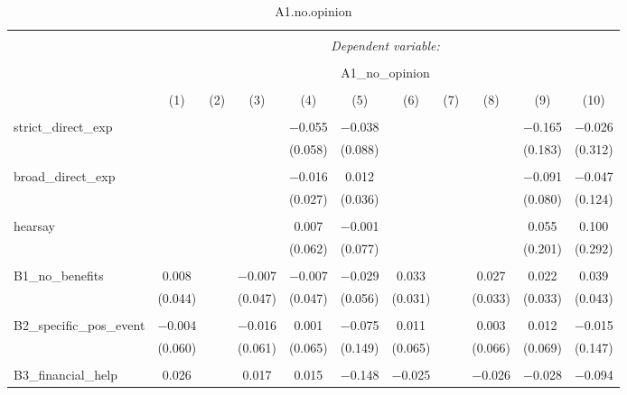
\begin{table}[H] \centering 
  \caption{A1.no.opinion} 
  \label{} 
\tiny 
\begin{tabular}{@{\extracolsep{4pt}}lcccccccccc} 
\\[-1.8ex]\hline 
\hline \\[-1.8ex] 
 & \multicolumn{10}{c}{\textit{Dependent variable:}} \\ 
\cline{2-11} 
\\[-1.8ex] & \multicolumn{10}{c}{A1\_no\_opinion} \\ 
\\[-1.8ex] & (1) & (2) & (3) & (4) & (5) & (6) & (7) & (8) & (9) & (10)\\ 
\hline \\[-1.8ex] 
 strict\_direct\_exp &  &  &  & $-$0.055 & $-$0.038 &  &  &  & $-$0.165 & $-$0.026 \\ 
  &  &  &  & (0.058) & (0.088) &  &  &  & (0.183) & (0.312) \\ 
  & & & & & & & & & & \\ 
 broad\_direct\_exp &  &  &  & $-$0.016 & 0.012 &  &  &  & $-$0.091 & $-$0.047 \\ 
  &  &  &  & (0.027) & (0.036) &  &  &  & (0.080) & (0.124) \\ 
  & & & & & & & & & & \\ 
 hearsay &  &  &  & 0.007 & $-$0.001 &  &  &  & 0.055 & 0.100 \\ 
  &  &  &  & (0.062) & (0.077) &  &  &  & (0.201) & (0.292) \\ 
  & & & & & & & & & & \\ 
 B1\_no\_benefits & 0.008 &  & $-$0.007 & $-$0.007 & $-$0.029 & 0.033 &  & 0.027 & 0.022 & 0.039 \\ 
  & (0.044) &  & (0.047) & (0.047) & (0.056) & (0.031) &  & (0.033) & (0.033) & (0.043) \\ 
  & & & & & & & & & & \\ 
 B2\_specific\_pos\_event & $-$0.004 &  & $-$0.016 & 0.001 & $-$0.075 & 0.011 &  & 0.003 & 0.012 & $-$0.015 \\ 
  & (0.060) &  & (0.061) & (0.065) & (0.149) & (0.065) &  & (0.066) & (0.069) & (0.147) \\ 
  & & & & & & & & & & \\ 
 B3\_financial\_help & 0.026 &  & 0.017 & 0.015 & $-$0.148 & $-$0.025 &  & $-$0.026 & $-$0.028 & $-$0.094 \\ 

\end{tabular}
\end{table}
